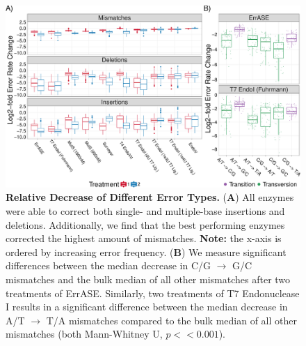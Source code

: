 \documentclass[twocolumn]{article}
\begin{document}
\clearpage
\begin{figure}[t]
\centering
\includegraphics[width=174mm]{Figure_4-1.pdf}
\caption{\small \textbf{Relative Decrease of Different Error Types.} (\textbf{A}) All enzymes were able to correct both single- and multiple-base insertions and deletions. Additionally, we find that the best performing enzymes corrected the highest amount of mismatches. \textbf{Note:} the x-axis is ordered by increasing error frequency. (\textbf{B}) We measure significant differences between the median decrease in C/G $\to$ G/C mismatches and the bulk median of all other mismatches after two treatments of ErrASE. Similarly, two treatments of T7 Endonuclease I results in a significant difference between the median decrease in A/T $\to$ T/A mismatches compared to the bulk median of all other mismatches (both Mann-Whitney U, $p << 0.001$). }
\end{figure}

\end{document}
